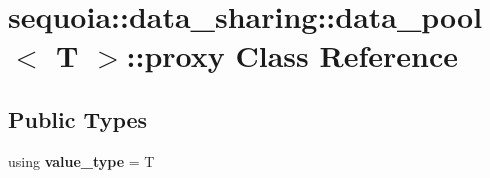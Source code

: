 \hypertarget{classsequoia_1_1data__sharing_1_1data__pool_1_1proxy}{}\section{sequoia\+::data\+\_\+sharing\+::data\+\_\+pool$<$ T $>$\+::proxy Class Reference}
\label{classsequoia_1_1data__sharing_1_1data__pool_1_1proxy}
\subsection*{Public Types}
\begin{DoxyCompactItemize}
\item 
\mbox{\label{classsequoia_1_1data__sharing_1_1data__pool_1_1proxy_ad764c6fe4634eb95e8ce5d3e203716e6}} 
using {\bfseries value\+\_\+type} = T
\end{DoxyCompactItemize}
